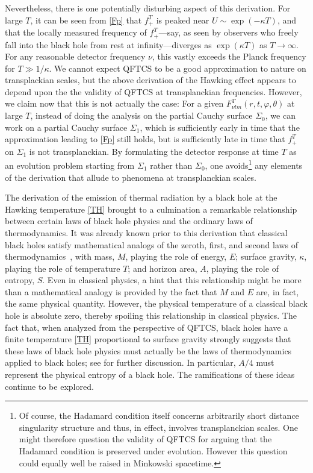 \documentclass[12pt]{article}
\theoremstyle{plain}
\theoremstyle{definition}
\begin{document}
Nevertheless, there is one potentially disturbing aspect of this derivation. For large $T$, it can be seen from \eqref{Fp}
that $f^T_+$ is peaked near $U \sim \exp(-\kappa T)$, and that the locally measured frequency of $f_+^T$---say, as seen by observers who freely fall into the black hole from rest at infinity---diverges as $\exp(\kappa T)$ as $T \to \infty$.  For any reasonable detector frequency $\nu$, this vastly exceeds the Planck frequency for $T \gg 1/\kappa$. We cannot expect QFTCS to be a good approximation to nature on transplackian scales, but the above derivation of the Hawking effect appears to depend upon the the validity of QFTCS at transplanckian frequencies. However, we claim now that this is not actually the case: For a given $F^T_{\nu l m}(r,t,\varphi,\theta)$ at large $T$, instead of doing the analysis on the partial Cauchy surface $\Sigma_0$, we can work on a partial Cauchy surface $\Sigma_1$, which is sufficiently early in time that the approximation leading to \eqref{Fp} still holds, but is sufficiently late in time
that $f^T_+$ on $\Sigma_1$ is not transplanckian. By formulating the detector response at time $T$ as an evolution problem starting from
$\Sigma_1$ rather than $\Sigma_0$, one avoids\footnote{Of course, the Hadamard condition itself concerns arbitrarily short distance singularity structure and thus, in effect, involves transplanckian scales. One might therefore question the validity of QFTCS for arguing that the Hadamard condition is preserved under evolution. However this question could equally well be raised in Minkowski spacetime.} any elements of the derivation that allude to phenomena at transplanckian scales.

The derivation of the emission of thermal radiation by a black hole at the Hawking temperature \eqref{TH}
brought to a culmination a remarkable relationship between certain laws of black hole physics and the ordinary laws of
thermodynamics. It was already known prior to this derivation that classical black holes satisfy mathematical analogs of the zeroth, first, and second laws of thermodynamics~\cite{bardeen},
with mass, $M$, playing the role of energy, $E$; surface gravity, $\kappa$, playing the role of temperature $T$; and horizon area, $A$, playing the role
of entropy, $S$. Even in classical physics, a hint that this relationship might be more than a mathematical analogy is provided by the
fact that $M$ and $E$ are, in fact, the same physical quantity. However, the physical temperature of a classical black hole is absolute zero, thereby spoiling this relationship in classical physics. The fact that, when analyzed from the perspective of QFTCS, black holes have a finite temperature \eqref{TH} proportional to surface gravity strongly suggests that these laws of black hole physics must
actually be the laws of thermodynamics applied to black holes; see \cite{wald2,wald3} for further discussion. In particular, $A/4$ must represent the physical entropy of a
black hole. The ramifications of these ideas continue to be explored.
\end{document}
